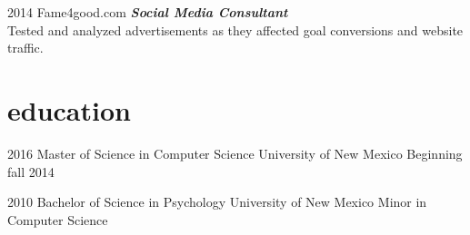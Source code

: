 \documentclass[]{friggeri-cv} %
\begin{document}
\begin{entrylist}
\entry
{2014}
{Fame4good.com}
{}
{\textbf{\emph{Social Media Consultant}} \\
Tested and analyzed advertisements as they affected goal conversions and website traffic.}
\end {entrylist}


\section{education}
\begin{entrylist}
\entry
{2016}
{Master of Science {\normalfont in Computer Science}}
{University of New Mexico}
{Beginning fall 2014}
\end{entrylist}

\begin{entrylist}
\entry
{2010}
{Bachelor of Science {\normalfont in Psychology}}
{University of New Mexico}
{Minor in Computer Science}
\end{entrylist}

\end{document}
